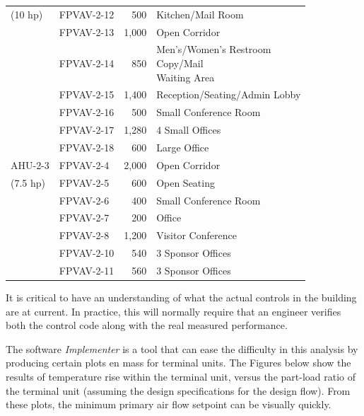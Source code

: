 \begin{table}[]
\begin{tabular}{@{}llrl@{}}
(10 hp)           & FPVAV-2-12 & 500   & Kitchen/Mail Room                        \\ \cmidrule(r){2-4}
                  & FPVAV-2-13 & 1,000 & Open Corridor                            \\ \cmidrule(r){2-4}
                  & FPVAV-2-14 & 850   & \pbox{\textwidth}{Men's/Women's Restroom \\ Copy/Mail         \\ Waiting Area } \\ \cmidrule(r){2-4}
                  & FPVAV-2-15 & 1,400 & Reception/Seating/Admin Lobby            \\ \cmidrule(r){2-4}
                  & FPVAV-2-16 & 500   & Small Conference Room                    \\ \cmidrule(r){2-4}
                  & FPVAV-2-17 & 1,280 & 4 Small Offices                          \\ \cmidrule(r){2-4}
                  & FPVAV-2-18 & 600   & Large Office                             \\ \midrule
AHU-2-3           & FPVAV-2-4  & 2,000 & Open Corridor                            \\ \cmidrule(r){2-4}
(7.5 hp)          & FPVAV-2-5  & 600   & Open Seating                             \\ \cmidrule(r){2-4}
                  & FPVAV-2-6  & 400   & Small Conference Room                    \\ \cmidrule(r){2-4}
                  & FPVAV-2-7  & 200   & Office                                   \\ \cmidrule(r){2-4}
                  & FPVAV-2-8  & 1,200 & Visitor Conference                       \\ \cmidrule(r){2-4}
                  & FPVAV-2-10 & 540   & 3 Sponsor Offices                        \\ \cmidrule(r){2-4}
                  & FPVAV-2-11 & 560   & 3 Sponsor Offices                        \\ \bottomrule
\end{tabular}
\end{table}

It is critical to have an understanding of what the actual controls in
the building are at current. In practice, this will normally require
that an engineer verifies both the control code along with the real
measured performance.

The software \textit{Implementer} is a tool that can ease the difficulty
in this analysis by producing certain plots en mass for terminal units.
The Figures below show the results of temperature rise within the
terminal unit, versus the part-load ratio of the terminal unit (assuming the
design specifications for the design flow). From these plots, the
minimum primary air flow setpoint can be visually quickly.

